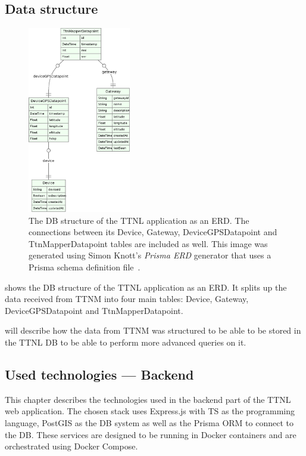 \subsection{Data structure}

\begin{figure}[htbp]
    \centering
    \includegraphics[width=0.4\textwidth]{pictures/ttn-locator/backend/prisma-erd.eps}
    \caption{
        The \ac{DB} structure of the \ac{TTNL} application as an \ac{ERD}.
        The connections between its Device, Gateway, DeviceGPSDatapoint and TtnMapperDatapoint tables are included as well.
        This image was generated using Simon Knott's \emph{Prisma ERD} generator that uses a Prisma schema definition file~\cite{simon_knott_prisma_2023}.
    }\label{pic:prisma-erd}
\end{figure}

 shows the \ac{DB} structure of the \ac{TTNL} application as an \ac{ERD}.
It splits up the data received from \ac{TTNM} into four main tables: Device, Gateway, DeviceGPSDatapoint and TtnMapperDatapoint.

 will describe how the data from \ac{TTNM} was structured to be able to be stored in the \ac{TTNL} \ac{DB} to be able to perform more advanced queries on it.

\subsection{Used technologies --- Backend}

This chapter describes the technologies used in the backend part of the \ac{TTNL} web application.
The chosen stack uses Express.js with \ac{TS} as the programming language, PostGIS as the \ac{DB} system as well as the Prisma \ac{ORM} to connect to the \ac{DB}.
These services are designed to be running in Docker containers and are orchestrated using Docker Compose.

